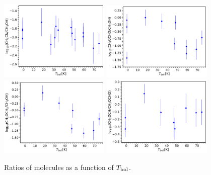 \documentclass[twocolumn]{aastex62}
\newcommand{\tbol}{\mbox{$T_{\rm bol}$}}
\begin{document}
\begin{figure}[htbp!]
  \centering
  \includegraphics[width=0.47\textwidth]{ratio_ch3cn_ch3oh_tbol.pdf}
  \includegraphics[width=0.47\textwidth]{ratio_ch3ocho_ch3oh_tbol.pdf}
  \includegraphics[width=0.47\textwidth]{ratio_ch3och3_ch3oh_tbol.pdf}
  \includegraphics[width=0.47\textwidth]{ratio_ch3och3_ch3ocho_tbol.pdf}
  \caption{Ratios of molecules as a function of \tbol.}
  \label{fig:ratio_tbol}
\end{figure}
\end{document}
